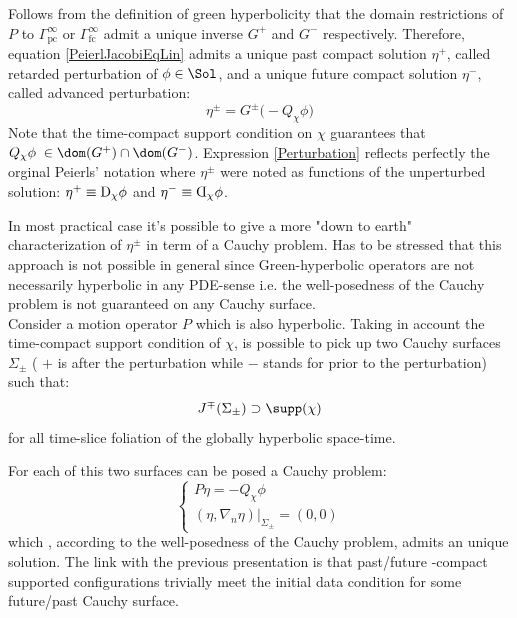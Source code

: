 \documentclass[Main]{subfiles}
\begin{document}
		 Follows from the definition of green hyperbolicity that the domain restrictions of $P$ to $\Gamma^\infty_{\textrm{pc}}$ or $\Gamma^\infty_{\textrm{fc}}$ admit a unique inverse $G^+$ and $G^-$ respectively.
   		Therefore, equation \ref{PeierlJacobiEqLin} admits a unique past compact solution $\eta^+$, called retarded perturbation of $\phi\in \Sol$, and a unique future compact solution $\eta^-$, called advanced perturbation:
   		\begin{equation}\label{Perturbation}
   			\eta^\pm = G^\pm \big( - Q_\chi \phi \big)
   		\end{equation}
   		Note that the time-compact support condition on $\chi$ guarantees that $Q_\chi \phi \; \in \dom(G^+) \cap \dom(G^-)$.
   		Expression \ref{Perturbation} reflects perfectly the orginal Peierls' notation where $\eta^\pm$ were noted as functions of the unperturbed solution: $\eta^+ \equiv\reflectbox{\reflectbox{D}}_\chi \phi$ and $\eta^- \equiv  \reflectbox{D}_\chi \phi$.
		
		
		\begin{observation}
			In most practical case it's possible to give a more "down to earth" characterization of $\eta^\pm$ in term of a Cauchy problem.
			Has to be stressed that this approach is not possible in general since Green-hyperbolic operators are not necessarily hyperbolic in any PDE-sense i.e. the well-posedness of the Cauchy problem is not guaranteed on any Cauchy surface. \cite[pag 1]{Bar} \cite[remark 3.18]{Bar2010}\cite[remark 2.1]{Khavkine2014}
			\\
		Consider a motion operator $P$ which is also hyperbolic.
		Taking in account the time-compact support condition of $\chi$, is possible to pick up  two Cauchy surfaces $\Sigma_\pm$ ( $+$ is after the perturbation while $-$ stands for prior to the perturbation) such that:
		\begin{displaymath}
			J^\mp (\Sigma_\pm) \supset \supp(\chi) 
		\end{displaymath}
		for all time-slice foliation of the globally hyperbolic space-time.

		For each of this two surfaces can be posed a Cauchy problem:
		\begin{equation}\label{PerturbationCauchyProblem}
		   \begin{cases}
			   P \eta = - Q_\chi \phi \\
			   (\eta, \nabla_n \eta ) \big \vert_{\Sigma_{\pm}} = (0,0)
   			\end{cases}
   		\end{equation}
   		which , according to the well-posedness of the Cauchy problem, admits an unique solution.
   		The link with the previous presentation is that past/future -compact supported configurations trivially meet the initial data condition for some future/past Cauchy surface.
		\end{observation}
		
\end{document}
